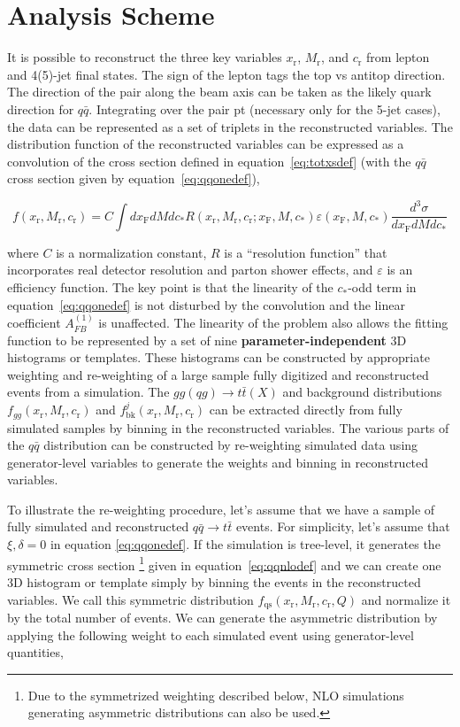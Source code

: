 \documentclass{cmspaperpdf}
\begin{document}
\clearpage
\section{Analysis Scheme}
\label{sec:analysis scheme}
It is possible to reconstruct the three key variables $x_\mathrm{r}$, $M_\mathrm{r}$, and $c_\mathrm{r}$ from lepton and 4(5)-jet final states.  The sign of the lepton tags the top vs antitop direction.  The direction of the pair along the beam axis can be taken as the likely quark direction for $q\bar q$.  Integrating over the pair pt (necessary only for the 5-jet cases), the data can be represented as a set of triplets in the reconstructed variables.  The distribution function of the reconstructed variables can be expressed as a convolution of the cross section defined in equation~\ref{eq:totxsdef} (with the $q\bar q$ cross section given by equation~\ref{eq:qqonedef}),

\begin{equation}
f(x_\mathrm{r},M_\mathrm{r},c_\mathrm{r}) = C \int dx_\mathrm{F}dMdc_* R(x_\mathrm{r},M_\mathrm{r},c_\mathrm{r}; x_\mathrm{F}, M, c_*)\varepsilon (x_\mathrm{F}, M, c_*) \frac{d^3\sigma}{dx_\mathrm{F}dM dc_*} 
\end{equation}

where $C$ is a normalization constant, $R$ is a ``resolution function'' that incorporates real detector resolution and parton shower effects, and $\varepsilon$ is an efficiency function.  The key point is that the linearity of the $c_*$-odd term in equation~\ref{eq:qqonedef} is not disturbed by the convolution and the linear coefficient $A_{FB}^{(1)}$ is unaffected.  The linearity of the problem also allows the fitting function to be represented by a set of nine {\bf parameter-independent} 3D histograms or templates.  These histograms can be constructed by appropriate weighting and re-weighting of a large sample fully digitized and reconstructed events from a simulation.  The $gg(qg)\to t\bar t(X)$ and background distributions $f_{gg}(x_\mathrm{r},M_\mathrm{r},c_\mathrm{r})$ and $f^j_\mathrm{bk}(x_\mathrm{r},M_\mathrm{r},c_\mathrm{r})$ can be extracted directly from fully simulated samples by binning in the reconstructed variables.  The various parts of the $q\bar q$ distribution can be constructed by re-weighting simulated data using generator-level variables to generate the weights and binning in reconstructed variables. 

To illustrate the re-weighting procedure, let's assume that we have a sample of fully simulated and reconstructed $q\bar q \to t\bar t$ events.  For simplicity, let's assume that $\xi,\delta=0$ in equation \ref{eq:qqonedef}.  If the simulation is tree-level, it generates the symmetric cross section \footnote{Due to the symmetrized weighting described below, NLO simulations generating asymmetric distributions can also be used.} given in equation~\ref{eq:qqnlodef} and we can create one 3D histogram or template simply by binning the events in the reconstructed variables.  We call this symmetric distribution $f_\mathrm{qs}(x_\mathrm{r}, M_\mathrm{r}, c_\mathrm{r}, Q)$ and normalize it by the total number of events.  We can generate the asymmetric distribution by applying the following weight to each simulated event using generator-level quantities,
\end{document}
